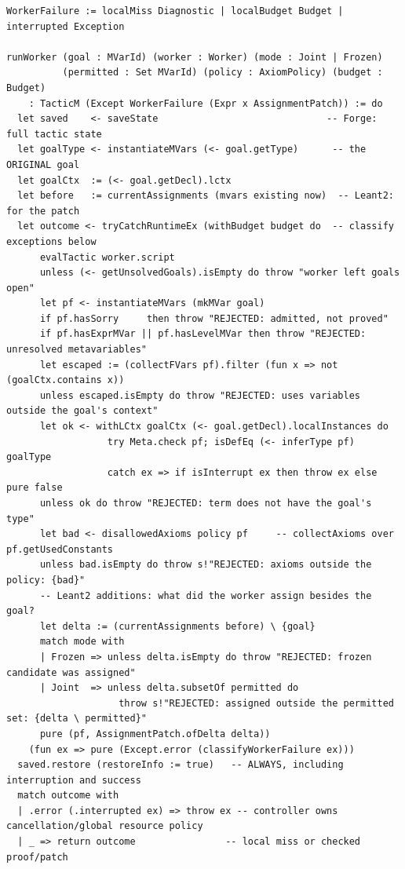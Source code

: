 \begin{lstlisting}
WorkerFailure := localMiss Diagnostic | localBudget Budget | interrupted Exception

runWorker (goal : MVarId) (worker : Worker) (mode : Joint | Frozen)
          (permitted : Set MVarId) (policy : AxiomPolicy) (budget : Budget)
    : TacticM (Except WorkerFailure (Expr x AssignmentPatch)) := do
  let saved    <- saveState                              -- Forge: full tactic state
  let goalType <- instantiateMVars (<- goal.getType)      -- the ORIGINAL goal
  let goalCtx  := (<- goal.getDecl).lctx
  let before   := currentAssignments (mvars existing now)  -- Leant2: for the patch
  let outcome <- tryCatchRuntimeEx (withBudget budget do  -- classify exceptions below
      evalTactic worker.script
      unless (<- getUnsolvedGoals).isEmpty do throw "worker left goals open"
      let pf <- instantiateMVars (mkMVar goal)
      if pf.hasSorry     then throw "REJECTED: admitted, not proved"
      if pf.hasExprMVar || pf.hasLevelMVar then throw "REJECTED: unresolved metavariables"
      let escaped := (collectFVars pf).filter (fun x => not (goalCtx.contains x))
      unless escaped.isEmpty do throw "REJECTED: uses variables outside the goal's context"
      let ok <- withLCtx goalCtx (<- goal.getDecl).localInstances do
                  try Meta.check pf; isDefEq (<- inferType pf) goalType
                  catch ex => if isInterrupt ex then throw ex else pure false
      unless ok do throw "REJECTED: term does not have the goal's type"
      let bad <- disallowedAxioms policy pf     -- collectAxioms over pf.getUsedConstants
      unless bad.isEmpty do throw s!"REJECTED: axioms outside the policy: {bad}"
      -- Leant2 additions: what did the worker assign besides the goal?
      let delta := (currentAssignments before) \ {goal}
      match mode with
      | Frozen => unless delta.isEmpty do throw "REJECTED: frozen candidate was assigned"
      | Joint  => unless delta.subsetOf permitted do
                    throw s!"REJECTED: assigned outside the permitted set: {delta \ permitted}"
      pure (pf, AssignmentPatch.ofDelta delta))
    (fun ex => pure (Except.error (classifyWorkerFailure ex)))
  saved.restore (restoreInfo := true)   -- ALWAYS, including interruption and success
  match outcome with
  | .error (.interrupted ex) => throw ex -- controller owns cancellation/global resource policy
  | _ => return outcome                -- local miss or checked proof/patch
\end{lstlisting}

